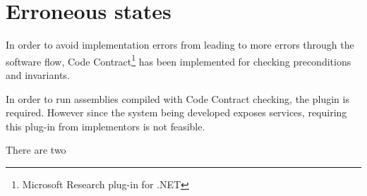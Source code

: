 \documentclass[../report.tex]{subfiles}
\begin{document}
\section{Erroneous states}

In order to avoid implementation errors from leading to more errors through the software flow, Code Contract\footnote{Microsoft Research plug-in for .NET} has been implemented for checking preconditions and invariants.

In order to run assemblies compiled with Code Contract checking, the plugin is required. However since the system being developed exposes services, requiring this plug-in from implementors is not feasible.

There are two
\end{document}

